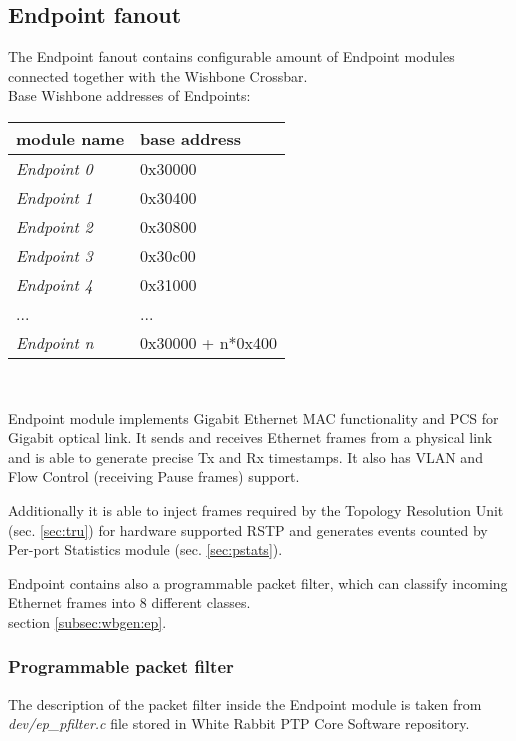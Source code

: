 \subsection{Endpoint fanout}

The Endpoint fanout contains configurable amount of Endpoint
modules connected together with the Wishbone Crossbar.\\

Base Wishbone addresses of Endpoints:\\

\begin{tabular}{|l|l|}
  \hline
  module name & base address\\
  \hline \hline
  \emph{Endpoint 0} & 0x30000\\
  \emph{Endpoint 1} & 0x30400\\
  \emph{Endpoint 2} & 0x30800\\
  \emph{Endpoint 3} & 0x30c00\\
  \emph{Endpoint 4} & 0x31000\\
                ... & ...\\
  \emph{Endpoint n} & 0x30000 + n*0x400\\
  \hline
\end{tabular}\\


Endpoint module implements Gigabit Ethernet MAC functionality and PCS for
Gigabit optical link. It sends and receives Ethernet frames from a physical link
and is able to generate precise Tx and Rx timestamps. It also has VLAN and Flow
Control (receiving Pause frames) support. 

Additionally it is able to inject frames required by the Topology Resolution
Unit (sec. \ref{sec:tru}) for hardware supported RSTP and generates events
counted by Per-port Statistics module (sec. \ref{sec:pstats}).

Endpoint contains also a programmable packet filter, which can classify
incoming Ethernet frames into 8 different classes.\\

 section \ref{subsec:wbgen:ep}.

\subsubsection{Programmable packet filter}
The description of the packet filter inside the
Endpoint module is taken from \emph{dev/ep\_pfilter.c} file stored in
White Rabbit PTP Core Software repository.\\

